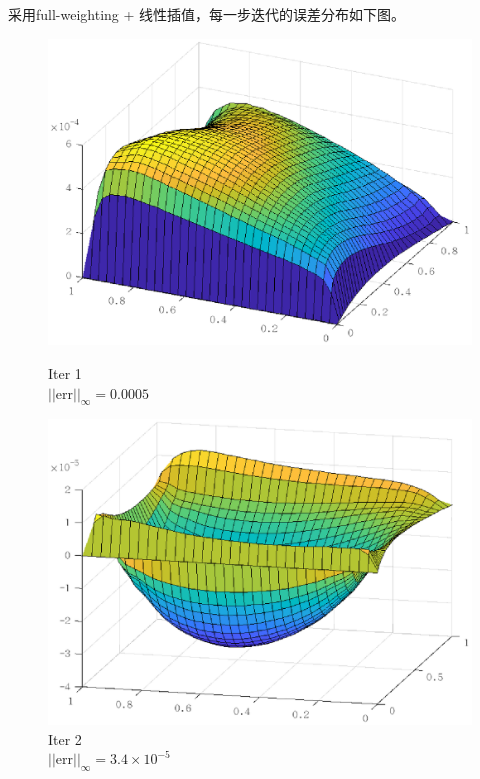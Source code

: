 \documentclass[lang=cn,10pt]{elegantbook}
\begin{document}
采用full-weighting + 线性插值，每一步迭代的误差分布如下图。
\begin{figure}[H]
  \centering
  \begin{minipage}[t]{0.22\linewidth}
      \centering
      \includegraphics[width=0.9\linewidth]{figure/3-5-4.eps}
      \caption*{\small Iter 1 \\ $||\text{err}||_\infty=0.0005$}
  \end{minipage}
  \hspace{1em}
  \begin{minipage}[t]{0.22\linewidth}
    \centering
    \includegraphics[width=0.9\linewidth]{figure/3-5-5.eps}
    \caption*{\small Iter 2 \\ $||\text{err}||_\infty=3.4\times 10^{-5}$}
  \end{minipage}
  \hspace{1em}
  \begin{minipage}[t]{0.22\linewidth}
    \centering

\end{minipage}
\end{figure}
\end{document}
